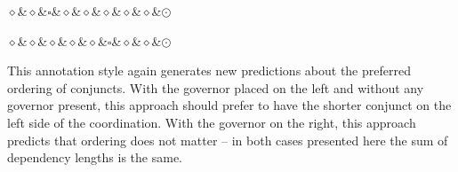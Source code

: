 \begin{multicols}{2}
\begin{exe}
\begin{xlist}
\ex
\begin{dependency}[theme = simple]
    \begin{deptext}
        $\diamond$\&$\diamond$\&$\square$\&$\diamond$\&$\diamond$\&$\diamond$\&$\diamond$\&$\diamond$\&$\odot$\\
    \end{deptext}
\end{dependency}

\ex
\begin{dependency}[theme = simple]
    \begin{deptext}
        $\diamond$\&$\diamond$\&$\diamond$\&$\diamond$\&$\diamond$\&$\square$\&$\diamond$\&$\diamond$\&$\odot$\\
    \end{deptext}
\end{dependency}
\end{xlist}
\end{exe}
\end{multicols}

This annotation style again generates new predictions about the preferred ordering of conjuncts. With the governor placed on the left and without any governor present, this approach should prefer to have the shorter conjunct on the left side of the coordination. With the governor on the right, this approach predicts that ordering does not matter -- in both cases presented here the sum of dependency lengths is the same. 
